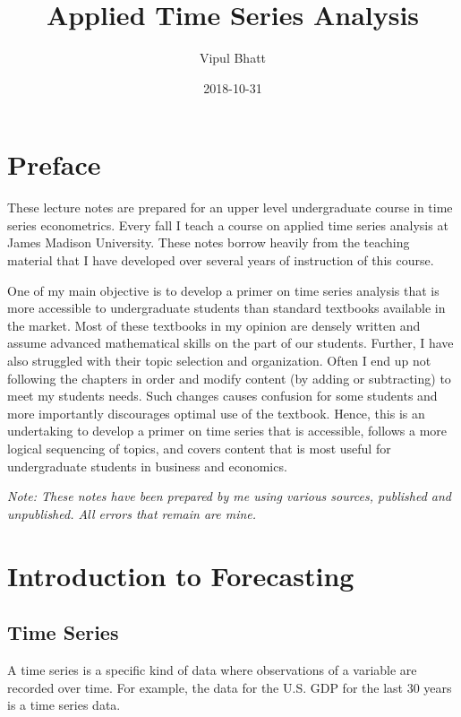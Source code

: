 \documentclass[]{book}
\title{Applied Time Series Analysis}
\author{Vipul Bhatt}
\date{2018-10-31}
\theoremstyle{definition}
\theoremstyle{definition}
\theoremstyle{definition}
\theoremstyle{remark}
\begin{document}
\maketitle

{
\setcounter{tocdepth}{1}
\tableofcontents
}
\hypertarget{preface}{%
\chapter*{Preface}\label{preface}}

These lecture notes are prepared for an upper level undergraduate course
in time series econometrics. Every fall I teach a course on applied time
series analysis at James Madison University. These notes borrow heavily
from the teaching material that I have developed over several years of
instruction of this course.

One of my main objective is to develop a primer on time series analysis
that is more accessible to undergraduate students than standard
textbooks available in the market. Most of these textbooks in my opinion
are densely written and assume advanced mathematical skills on the part
of our students. Further, I have also struggled with their topic
selection and organization. Often I end up not following the chapters in
order and modify content (by adding or subtracting) to meet my students
needs. Such changes causes confusion for some students and more
importantly discourages optimal use of the textbook. Hence, this is an
undertaking to develop a primer on time series that is accessible,
follows a more logical sequencing of topics, and covers content that is
most useful for undergraduate students in business and economics.

\emph{Note: These notes have been prepared by me using various sources,
published and unpublished. All errors that remain are mine.}

\hypertarget{intro}{%
\chapter{Introduction to Forecasting}\label{intro}}

\hypertarget{time-series}{%
\section{Time Series}\label{time-series}}

A time series is a specific kind of data where observations of a
variable are recorded over time. For example, the data for the U.S. GDP
for the last 30 years is a time series data.
\end{document}
